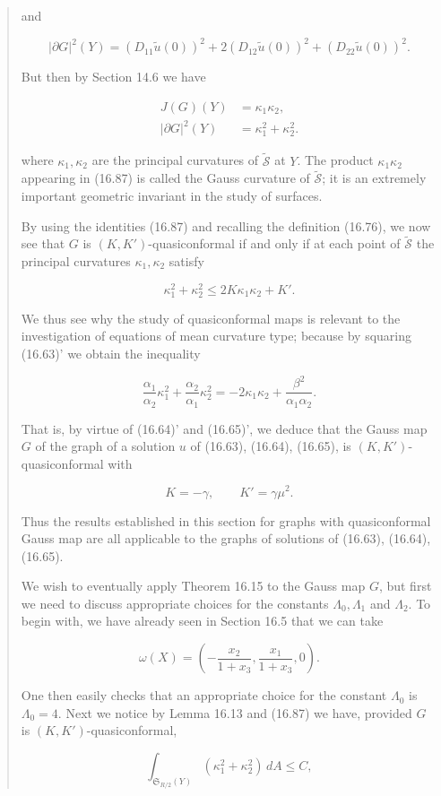 \begin{quote}
and

\[
|\partial G|^{2}(Y)=(D_{11}\tilde{u}(0))^{2}+2(D_{12}\tilde{u}(0))^{2}+(D_{22}\tilde{u}(0))^{2}.
\]

But then by Section 14.6 we have

\begin{equation}
\begin{aligned}
J(G)(Y)&=\kappa_{1}\kappa_{2},\\
|\partial G|^{2}(Y)&=\kappa_{1}^{2}+\kappa_{2}^{2}.
\end{aligned}
\tag{16.87}
\end{equation}

where $\kappa_{1}, \kappa_{2}$ are the principal curvatures of $\widetilde{\mathcal S}$ at $Y$. The product $\kappa_{1}\kappa_{2}$ appearing in (16.87) is called the Gauss curvature of $\widetilde{\mathcal S}$; it is an extremely important geometric invariant in the study of surfaces.

By using the identities (16.87) and recalling the definition (16.76), we now see that $G$ is $(K,K')$-quasiconformal if and only if at each point of $\widetilde{\mathcal S}$ the principal curvatures $\kappa_{1}, \kappa_{2}$ satisfy

\begin{equation}
\kappa_{1}^{2}+\kappa_{2}^{2}\leq 2K\kappa_{1}\kappa_{2}+K'.
\tag{16.88}
\end{equation}

We thus see why the study of quasiconformal maps is relevant to the investigation of equations of mean curvature type; because by squaring (16.63)' we obtain the inequality

\[
\frac{\alpha_{1}}{\alpha_{2}}\kappa_{1}^{2}+\frac{\alpha_{2}}{\alpha_{1}}\kappa_{2}^{2}=-2\kappa_{1}\kappa_{2}+\frac{\beta^{2}}{\alpha_{1}\alpha_{2}}.
\]

That is, by virtue of (16.64)' and (16.65)', we deduce that the Gauss map $G$ of the graph of a solution $u$ of (16.63), (16.64), (16.65), is $(K,K')$-quasiconformal with

\begin{equation}
K=-\gamma,\qquad K'=\gamma\mu^{2}.
\tag{16.89}
\end{equation}

Thus the results established in this section for graphs with quasiconformal Gauss map are all applicable to the graphs of solutions of (16.63), (16.64), (16.65).

We wish to eventually apply Theorem 16.15 to the Gauss map $G$, but first we need to discuss appropriate choices for the constants $\Lambda_{0}, \Lambda_{1}$ and $\Lambda_{2}$. To begin with, we have already seen in Section 16.5 that we can take

\[
\omega(X)=\left(-\frac{x_{2}}{1+x_{3}},\frac{x_{1}}{1+x_{3}},0\right).
\]

One then easily checks that an appropriate choice for the constant $\Lambda_{0}$ is $\Lambda_{0}=4$.
Next we notice by Lemma 16.13 and (16.87) we have, provided $G$ is $(K,K')$-quasiconformal,

\[
\int_{\mathfrak{S}_{R/2}(Y)}(\kappa_{1}^{2}+\kappa_{2}^{2})\,dA\leq C,
\]
\end{quote}

